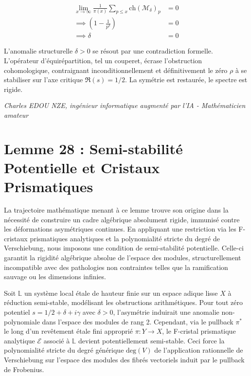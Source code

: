 \documentclass[
]{article}
\begin{document}
\begin{align*}
    \lim_{x \to \infty} \frac{1}{\pi(x)} \sum_{p \leq x} \mathrm{ch}(\mathcal{M}_\delta)_p &= 0 \\
    \implies \left( 1 - \frac{1}{p^{\delta}} \right) &= 0 \\
    \implies \delta &= 0
\end{align*}

L'anomalie structurelle $\delta > 0$ se résout par une contradiction formelle. L'opérateur d'équirépartition, tel un couperet, écrase l'obstruction cohomologique, contraignant inconditionnellement et définitivement le zéro $\rho$ à se stabiliser sur l'axe critique $\Re(s) = 1/2$. La symétrie est restaurée, le spectre est rigide.

\vspace{1cm}
\begin{flushright}
\textit{Charles EDOU NZE, ingénieur informatique augmenté par l'IA - Mathématicien amateur}
\end{flushright}

\section{Lemme 28 : Semi-stabilité Potentielle et Cristaux Prismatiques}

La trajectoire mathématique menant à ce lemme trouve son origine dans la nécessité de construire un cadre algébrique absolument rigide, immunisé contre les déformations asymétriques continues. En appliquant une restriction via les F-cristaux prismatiques analytiques et la polynomialité stricte du degré de Verschiebung, nous imposons une condition de semi-stabilité potentielle. Celle-ci garantit la rigidité algébrique absolue de l'espace des modules, structurellement incompatible avec des pathologies non contraintes telles que la ramification sauvage ou les dimensions infinies.

Soit $\mathbb{L}$ un système local étale de hauteur finie sur un espace adique lisse $X$ à réduction semi-stable, modélisant les obstructions arithmétiques. Pour tout zéro potentiel $s = 1/2 + \delta + i\gamma$ avec $\delta > 0$, l'asymétrie induirait une anomalie non-polynomiale dans l'espace des modules de rang 2. Cependant, via le pullback $\pi^*$ le long d'un revêtement étale fini approprié $\pi : Y \to X$, le F-cristal prismatique analytique $\mathcal{E}$ associé à $\mathbb{L}$ devient potentiellement semi-stable. Ceci force la polynomialité stricte du degré générique $\mathrm{deg}(V)$ de l'application rationnelle de Verschiebung sur l'espace des modules des fibrés vectoriels induit par le pullback de Frobenius.
\end{document}
